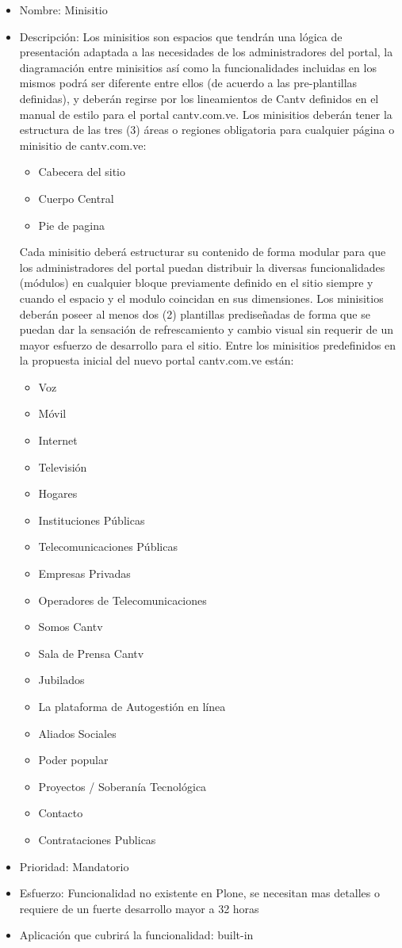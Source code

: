 \documentclass[11pt, letterpaper, oneside, spanish]{scrbook}
\begin{document}
\begin{itemize}
\item Nombre: Minisitio
\item Descripción: Los minisitios son espacios que tendrán una lógica de
  presentación adaptada a las necesidades de los administradores del portal,
  la diagramación entre minisitios así como la funcionalidades incluidas en
  los mismos podrá ser diferente entre ellos (de acuerdo a las pre-plantillas
  definidas), y deberán regirse por los lineamientos de Cantv definidos en el
  manual de estilo para el portal cantv.com.ve.  Los minisitios deberán tener
  la estructura de las tres (3) áreas o regiones obligatoria para cualquier
  página o minisitio de cantv.com.ve:
\begin{itemize}
\item Cabecera del sitio
\item Cuerpo Central
\item Pie de pagina
\end{itemize}
Cada minisitio deberá estructurar su contenido de forma modular para que los
  administradores del portal puedan distribuir la diversas funcionalidades
  (módulos) en cualquier bloque previamente definido en el sitio siempre y
  cuando el espacio y el modulo coincidan en sus dimensiones.  Los minisitios
  deberán poseer al menos dos (2) plantillas prediseñadas de forma que se
  puedan dar la sensación de refrescamiento y cambio visual sin requerir de un
  mayor esfuerzo de desarrollo para el sitio. Entre los minisitios
  predefinidos en la propuesta inicial del nuevo portal cantv.com.ve están:
\begin{itemize}
\item Voz
\item Móvil
\item Internet
\item Televisión
\item Hogares
\item Instituciones Públicas
\item Telecomunicaciones Públicas
\item Empresas Privadas
\item Operadores de Telecomunicaciones
\item Somos Cantv
\item Sala de Prensa Cantv
\item Jubilados
\item La plataforma de Autogestión en línea
\item Aliados Sociales
\item Poder popular
\item Proyectos / Soberanía Tecnológica
\item Contacto
\item Contrataciones Publicas
\end{itemize}
\item Prioridad: Mandatorio
\item Esfuerzo: Funcionalidad no existente en Plone, se necesitan mas detalles o
  requiere de un fuerte desarrollo mayor a 32 horas
\item Aplicación que cubrirá la funcionalidad:  built-in
\end{itemize}
\end{document}

